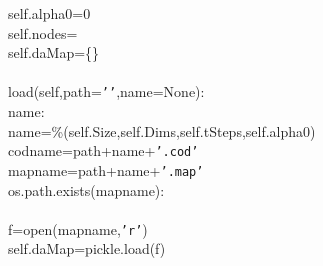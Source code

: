 {{\begin{tabbing}
\hspace{48pt}self.alpha0\hspace{6pt}=\hspace{6pt}0\\
\hspace{48pt}self.nodes\hspace{6pt}=\hspace{6pt}{[}{]}\\
\hspace{48pt}self.daMap\hspace{6pt}=\hspace{6pt}\{\}\\
\\
\hspace{6pt}load(self,path={\texttt{{'}{'}}},name=None):\\
\hspace{6pt}name:\\
\hspace{72pt}name\hspace{6pt}=\%(self.Size,self.Dims,self.tSteps,self.alpha0)\\
\hspace{48pt}codname\hspace{6pt}=\hspace{6pt}path+name+{\texttt{{'}.cod{'}}}\\
\hspace{48pt}mapname\hspace{6pt}=\hspace{6pt}path+name+{\texttt{{'}.map{'}}}\\
\hspace{6pt}os.path.exists(mapname):\\
\\
\hspace{96pt}f\hspace{6pt}=\hspace{6pt}open(mapname,{\texttt{{'}r{'}}})\\
\hspace{96pt}self.daMap\hspace{6pt}=\hspace{6pt}pickle.load(f)\\

\end{tabbing}}}
